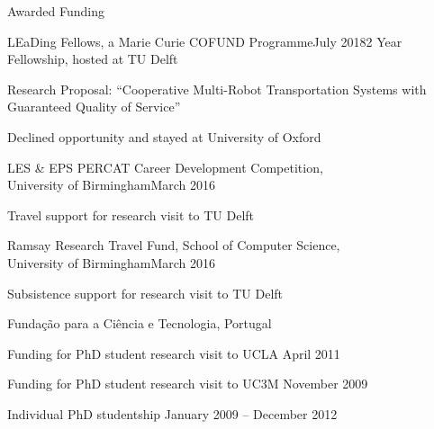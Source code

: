 
\begin{rSection}{Awarded Funding}

\begin{rSubsection}{ LEaDing Fellows, a Marie Curie COFUND Programme}{July 2018}{2 Year Fellowship, hosted at TU Delft }{}
\item Research Proposal: ``Cooperative Multi-Robot Transportation Systems with Guaranteed Quality of Service''
\item Declined opportunity and stayed at University of Oxford
\end{rSubsection}

\begin{rSubsection}{ LES \& EPS PERCAT Career Development Competition,\\ University of Birmingham}{March 2016}{}{}
\item Travel support for research visit to TU Delft\\
\end{rSubsection}

\begin{rSubsection}{ Ramsay Research Travel Fund, School of Computer Science, \\ University of Birmingham}{March 2016}{}{}
\item Subsistence support for research visit to TU Delft \\
\end{rSubsection} 

\begin{rSubsection}{ Funda\c{c}\~{a}o para a Ci\^{e}ncia e Tecnologia, Portugal}{}{}{}
\item Funding for PhD student research visit to UCLA \hfill April 2011\\

\item Funding for PhD student research visit to UC3M \hfill November 2009\\

\item Individual PhD studentship  \hfill  January 2009 -- December 2012\\

\end{rSubsection}

\end{rSection}

